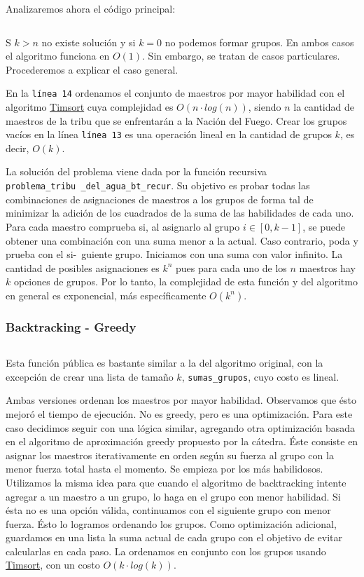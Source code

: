 \documentclass{article}
\begin{document}
Analizaremos ahora el código principal:
\inputminted[linenos, firstline=1, lastline=45]{python}{codigo/backtracking.py}

S $k > n$ no existe solución y si $k = 0$ no podemos formar grupos. En ambos casos el algoritmo funciona en $O(1)$. Sin embargo, se tratan de casos particulares. Procederemos a explicar el caso general.

En la \texttt{línea 14} ordenamos el conjunto de maestros por mayor habilidad con el algoritmo \href{https://svn.python.org/projects/python/trunk/Objects/listsort.txt}{Timsort} cuya complejidad es $O(n \cdot log(n))$, siendo $n$ la cantidad de maestros de la tribu que se enfrentarán a la Nación del Fuego. Crear los grupos vacíos en la línea \texttt{línea 13} es una operación lineal en la cantidad de grupos $k$, es decir, $O(k)$. 

La solución del problema viene dada por la función recursiva \texttt{problema\_tribu\
\_del\_agua\_bt\_recur}. Su objetivo es probar todas las combinaciones de asignaciones de maestros a los grupos de forma tal de minimizar la adición de los cuadrados de la suma de las habilidades de cada uno. Para cada maestro comprueba si, al asignarlo al grupo $i \in [0, k-1]$, se puede obtener una combinación con una suma menor a la actual. Caso contrario, poda y prueba con el si-\ guiente grupo. Iniciamos con una suma con valor infinito. La cantidad de posibles asignaciones es $k^n$ pues para cada uno de los $n$ maestros hay $k$ opciones de grupos. Por lo tanto, la complejidad de esta función y del algoritmo en general es exponencial, más específicamente $O(k^n)$.

\subsubsection{Backtracking - Greedy}
\label{sec:bt-greedy}

\inputminted[linenos, firstline=3, lastline=27]{python}{codigo/backtracking_con_greedy.py}

Esta función pública es bastante similar a la del algoritmo original, con la excepción de crear una lista de tamaño $k$, \texttt{sumas\_grupos}, cuyo costo es lineal.

Ambas versiones ordenan los maestros por mayor habilidad. Observamos que ésto mejoró el tiempo de ejecución. No es greedy, pero es una optimización. Para este caso decidimos seguir con una lógica similar, agregando otra optimización basada en el algoritmo de aproximación greedy propuesto por la cátedra. Éste consiste en asignar los maestros iterativamente en orden según su fuerza al grupo con la menor fuerza total hasta el momento. Se empieza por los más habilidosos. Utilizamos la misma idea para que cuando el algoritmo de backtracking intente agregar a un maestro a un grupo, lo haga en el grupo con menor habilidad. Si ésta no es una opción válida, continuamos con el siguiente grupo con menor fuerza. Ésto lo logramos ordenando los grupos. Como optimización adicional, guardamos en una lista la suma actual de cada grupo con el objetivo de evitar calcularlas en cada paso. La ordenamos en conjunto con los grupos usando \href{https://svn.python.org/projects/python/trunk/Objects/listsort.txt}{Timsort}, con un costo $O(k \cdot log(k))$.  
\end{document}
